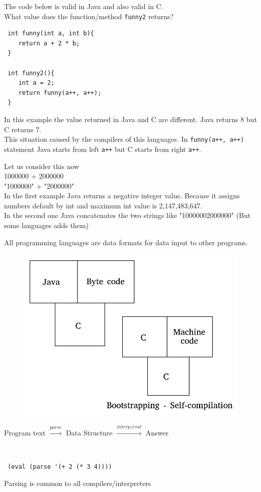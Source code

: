 \documentclass{article}
\begin{document}
\begin{flushleft}
The code below is valid in Java and also valid in C. \\
What value does the function/method \verb|funny2| returns?

\begin{verbatim}
 int funny(int a, int b){
    return a + 2 * b;
 }
 
 int funny2(){
    int a = 2;
    return funny(a++, a++);
 }
\end{verbatim}

In this example the value returned in Java and C are different. Java returns 8 but C returns 7.\\
This situation caused by the compilers of this languages. In \verb|funny(a++, a++)| statement Java starts from left \verb|a++| but C starts from right \verb|a++|.\linebreak

Let us consider this now\\
1000000 + 2000000\\
"1000000" + "2000000"\\
In the first example Java returns a negative integer value. Because it assigns numbers default by int and maximum int value is 2,147,483,647.\\
In the second one Java concatenates the two strings like "10000002000000" (But some languages adds them)\linebreak

All programming languages are data formats for data input to other programs.\\
\begin{figure}[h]
  \includegraphics[scale=0.2]{bootstrapping}
\end{figure}

\centerline{Program text $\xrightarrow{parse}$ Data Structure $\xrightarrow{interp/eval}$ Answer}\\
\begin{verbatim}
 (eval (parse '(+ 2 (* 3 4))))
\end{verbatim}
Parsing is common to all compilers/interpreters


\end{flushleft}
\end{document}
